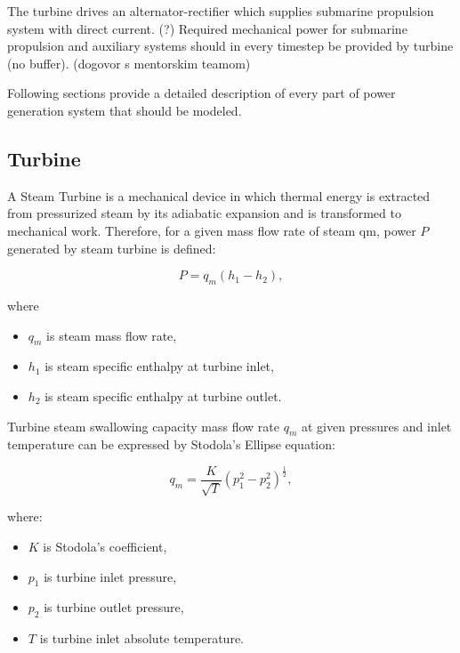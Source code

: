 \documentclass{article}
\begin{document}
	The turbine drives an alternator-rectifier which supplies submarine propulsion system with direct current. (?) Required mechanical power for submarine propulsion and auxiliary systems should in every timestep be provided by turbine (no buffer). (dogovor s mentorskim teamom)
	
	Following sections provide a detailed description of every part of power generation system that should be modeled.
	
	\subsection{Turbine}
	
	A Steam Turbine is a mechanical device in which thermal energy is extracted from pressurized steam by its adiabatic expansion and is transformed to mechanical work.  Therefore, for a given mass flow rate of steam qm, power $P$ generated by steam turbine is defined:
	
	\begin{equation}\label{eq:power}
		P = q_m(h_1 - h_2),
	\end{equation}
	
	\noindent
	where 
	
	\begin{itemize}
		\item $q_m$ is steam mass flow rate, 
		\item $h_1$ is steam specific enthalpy at turbine inlet,
		\item $h_2$ is steam specific enthalpy at turbine outlet.
	\end{itemize}

	Turbine steam swallowing capacity mass flow rate $q_m$ at given pressures and inlet temperature can be expressed by Stodola’s Ellipse equation:
	
	\begin{equation}\label{eq:stodola}
		q_m = \frac{K}{\sqrt{T}}(p_1^2 - p_2^2)^\frac{1}{2},
	\end{equation}
	
	\noindent
	where:
	
	\begin{itemize}
		\item $K$ is Stodola’s coefficient, 
		\item $p_1$ is turbine inlet pressure,
		\item $p_2$ is turbine outlet pressure,
		\item $T$ is turbine inlet absolute temperature.
	\end{itemize}
	
\end{document}
